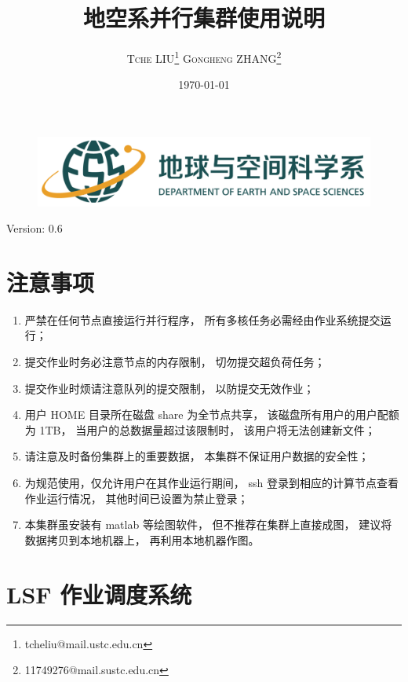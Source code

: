 \documentclass[UTF8]{ctexart}
\title{\vspace{10mm}\heiti\huge 地空系并行集群使用说明\vspace{30mm}}
\author{\LARGE\textsc{Tche LIU}\thanks{tcheliu@mail.ustc.edu.cn}\hspace{10mm}
\textsc{Gongheng ZHANG}\thanks{11749276@mail.sustc.edu.cn}
\vspace{10mm}}
\date{\today}
\begin{document}
\begin{figure}[t]
  \centering
  \includegraphics[width=125mm]{material/esslogo.png}
\end{figure}
\maketitle
\centerline{Version: 0.6}
\newpage

\tableofcontents
\newpage

\section{注意事项}
\begin{enumerate}[\hspace{15mm}（1）]
  \item 严禁在任何节点直接运行并行程序，
    所有多核任务必需经由作业系统提交运行；
  \item 提交作业时务必注意节点的内存限制，
    切勿提交超负荷任务；
  \item 提交作业时烦请注意队列的提交限制，
    以防提交无效作业；
  \item 用户 HOME 目录所在磁盘 share 为全节点共享，
    该磁盘所有用户的用户配额为 1TB，
    当用户的总数据量超过该限制时，
    该用户将无法创建新文件；
  \item 请注意及时备份集群上的重要数据，
    本集群不保证用户数据的安全性；
  \item 为规范使用，仅允许用户在其作业运行期间，
    ssh 登录到相应的计算节点查看作业运行情况，
    其他时间已设置为禁止登录；
  \item 本集群虽安装有 matlab 等绘图软件，
    但不推荐在集群上直接成图，
    建议将数据拷贝到本地机器上，
    再利用本地机器作图。
\end{enumerate}

\section{LSF 作业调度系统}
\end{document}
